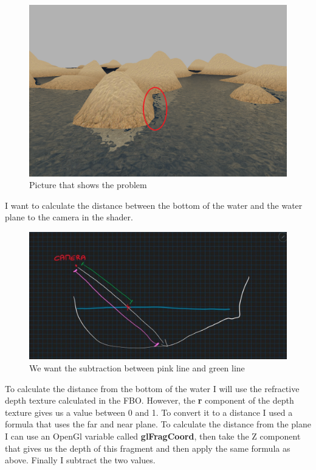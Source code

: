 \begin{figure}[hbt!]
	\centering
	\includegraphics[width= 0.9
	\textwidth]{images/Water6.png}
	\caption{Picture that shows the problem}
\end{figure} 

\noindent
I want to calculate the distance between the bottom of the water and the water plane to the camera in the shader.

\begin{figure}[hbt!]
	\centering
	\includegraphics[width= 0.9
	\textwidth]{images/Water7.jpg}
	\caption{We want the subtraction between pink line and green line}
\end{figure} 

\noindent
To calculate the distance from the bottom of the water I will use the refractive depth texture calculated in the FBO. However, the \textbf{r} component of the depth texture gives us a value between 0 and 1. To convert it to a distance I used a formula that uses the far and near plane.
To calculate the distance from the plane I can use an OpenGl variable called \textbf{gl\textunderscore FragCoord}, then take the Z component that gives us the depth of this fragment and then apply the same formula as above. Finally I subtract the two values.

